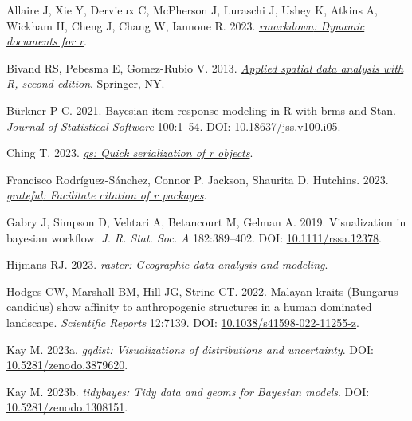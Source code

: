 \documentclass[10pt,a4paper]{article}
\newlength{\cslhangindent}
\newlength{\cslentryspacingunit} %
\newenvironment{CSLReferences}[2] %
 {%
  \setlength{\parindent}{0pt}
  \ifodd #1
  \let\oldpar\par
  \def\par{\hangindent=\cslhangindent\oldpar}
  \fi
  \setlength{\parskip}{#2\cslentryspacingunit}
 }%
 {}
\begin{document}
\hypertarget{refs}{}
\begin{CSLReferences}{1}{0}
\leavevmode{}%
Allaire J, Xie Y, Dervieux C, McPherson J, Luraschi J, Ushey K, Atkins A, Wickham H, Cheng J, Chang W, Iannone R. 2023. \emph{\href{https://github.com/rstudio/rmarkdown}{{rmarkdown}: Dynamic documents for r}}.

\leavevmode{}%
Bivand RS, Pebesma E, Gomez-Rubio V. 2013. \emph{\href{https://asdar-book.org/}{Applied spatial data analysis with {R}, second edition}}. Springer, NY.

\leavevmode{}%
Bürkner P-C. 2021. Bayesian item response modeling in {R} with {brms} and {Stan}. \emph{Journal of Statistical Software} 100:1--54. DOI: \href{https://doi.org/10.18637/jss.v100.i05}{10.18637/jss.v100.i05}.

\leavevmode{}%
Ching T. 2023. \emph{\href{https://CRAN.R-project.org/package=qs}{{qs}: Quick serialization of r objects}}.

\leavevmode{}%
Francisco Rodríguez-Sánchez, Connor P. Jackson, Shaurita D. Hutchins. 2023. \emph{\href{https://github.com/Pakillo/grateful}{{grateful}: Facilitate citation of r packages}}.

\leavevmode{}%
Gabry J, Simpson D, Vehtari A, Betancourt M, Gelman A. 2019. Visualization in bayesian workflow. \emph{J. R. Stat. Soc. A} 182:389--402. DOI: \href{https://doi.org/10.1111/rssa.12378}{10.1111/rssa.12378}.

\leavevmode{}%
Hijmans RJ. 2023. \emph{\href{https://CRAN.R-project.org/package=raster}{{raster}: Geographic data analysis and modeling}}.

\leavevmode{}%
Hodges CW, Marshall BM, Hill JG, Strine CT. 2022. Malayan kraits ({Bungarus} candidus) show affinity to anthropogenic structures in a human dominated landscape. \emph{Scientific Reports} 12:7139. DOI: \href{https://doi.org/10.1038/s41598-022-11255-z}{10.1038/s41598-022-11255-z}.

\leavevmode{}%
Kay M. 2023a. \emph{{ggdist}: Visualizations of distributions and uncertainty}. DOI: \href{https://doi.org/10.5281/zenodo.3879620}{10.5281/zenodo.3879620}.

\leavevmode{}%
Kay M. 2023b. \emph{{tidybayes}: Tidy data and geoms for {Bayesian} models}. DOI: \href{https://doi.org/10.5281/zenodo.1308151}{10.5281/zenodo.1308151}.


\end{CSLReferences}
\end{document}
